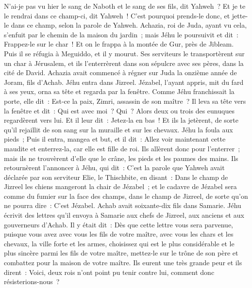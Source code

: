 \begin{multicols}{2}
N'ai-je pas vu hier le sang de Naboth et le sang de ses fils, dit Yahweh~? Et je te le rendrai dans ce champ-ci, dit Yahweh~! C'est pourquoi prends-le donc, et jette-le dans ce champ, selon la parole de Yahweh.
Achazia, roi de Juda, ayant vu cela, s'enfuit par le chemin de la maison du jardin~; mais Jéhu le poursuivit et dit~: Frappez-le sur le char~! Et on le frappa à la montée de Gur, près de Jibleam. Puis il se réfugia à Meguiddo, et il y mourut.
Ses serviteurs le transportèrent sur un char à Jérusalem, et ils l'enterrèrent dans son sépulcre avec ses pères, dans la cité de David.
Achazia avait commencé à régner sur Juda la onzième année de Joram, fils d'Achab.
Jéhu entra dans Jizreel. Jézabel, l'ayant appris, mit du fard à ses yeux, orna sa tête et regarda par la fenêtre.
Comme Jéhu franchissait la porte, elle dit~: Est-ce la paix, Zimri, assassin de son maître~?
Il leva sa tête vers la fenêtre et dit~: Qui est avec moi~? Qui~? Alors deux ou trois des eunuques regardèrent vers lui.
Et il leur dit~: Jetez-la en bas~! Et ils la jetèrent, de sorte qu'il rejaillit de son sang sur la muraille et sur les chevaux. Jéhu la foula aux pieds~;
Puis il entra, mangea et but, et il dit~: Allez voir maintenant cette maudite et enterrez-la, car elle est fille de roi.
Ils allèrent donc pour l'enterrer~; mais ils ne trouvèrent d'elle que le crâne, les pieds et les paumes des mains.
Ils retournèrent l'annoncer à Jéhu, qui dit~: C'est la parole que Yahweh avait déclarée par son serviteur Elie, le Thischbite, en disant~: Dans le champ de Jizreel les chiens mangeront la chair de Jézabel~;
et le cadavre de Jézabel sera comme du fumier sur la face des champs, dans le champ de Jizreel, de sorte qu'on ne pourra dire~: C'est Jézabel.
\VerseOne{}Achab avait soixante-dix fils dans Samarie. Jéhu écrivit des lettres qu'il envoya à Samarie aux chefs de Jizreel, aux anciens et aux gouverneurs d'Achab. Il y était dit~:
Dès que cette lettre vous sera parvenue, puisque vous avez avec vous les fils de votre maître, avec vous les chars et les chevaux, la ville forte et les armes,
choisissez qui est le plus considérable et le plus sincère parmi les fils de votre maître, mettez-le sur le trône de son père et combattez pour la maison de votre maître.
Ils eurent une très grande peur et ils dirent~: Voici, deux rois n'ont point pu tenir contre lui, comment donc résisterions-nous~?

\end{multicols}
